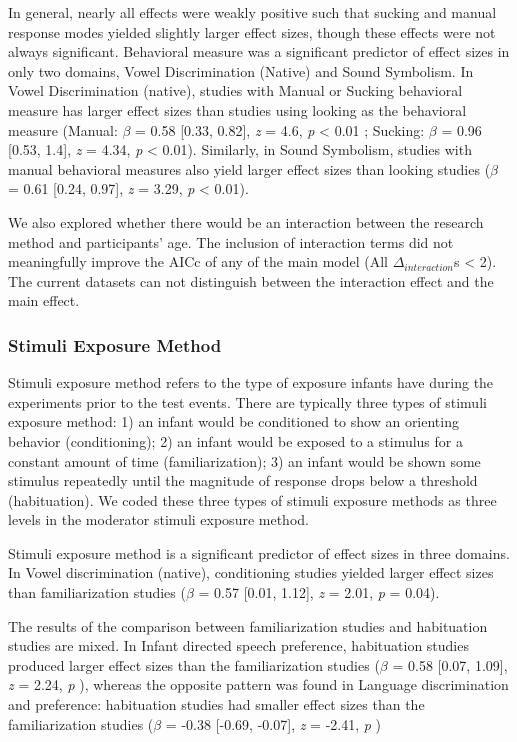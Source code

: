 \documentclass[10pt, letterpaper]{article}
\begin{document}
In general, nearly all effects were weakly positive such that sucking
and manual response modes yielded slightly larger effect sizes, though
these effects were not always significant. Behavioral measure was a
significant predictor of effect sizes in only two domains, Vowel
Discrimination (Native) and Sound Symbolism. In Vowel Discrimination
(native), studies with Manual or Sucking behavioral measure has larger
effect sizes than studies using looking as the behavioral measure
(Manual: \(\beta\) = 0.58 {[}0.33, 0.82{]}, \emph{z} = 4.6, \emph{p}
\textless{} 0.01 ; Sucking: \(\beta\) = 0.96 {[}0.53, 1.4{]}, \emph{z} =
4.34, \emph{p} \textless{} 0.01). Similarly, in Sound Symbolism, studies
with manual behavioral measures also yield larger effect sizes than
looking studies (\(\beta\) = 0.61 {[}0.24, 0.97{]}, \emph{z} = 3.29,
\emph{p} \textless{} 0.01).

We also explored whether there would be an interaction between the
research method and participants' age. The inclusion of interaction
terms did not meaningfully improve the AICc of any of the main model
(All \(\Delta_{interaction}\)s \textless{} 2). The current datasets can
not distinguish between the interaction effect and the main effect.

\hypertarget{stimuli-exposure-method}{%
\subsubsection{Stimuli Exposure Method}\label{stimuli-exposure-method}}

Stimuli exposure method refers to the type of exposure infants have
during the experiments prior to the test events. There are typically
three types of stimuli exposure method: 1) an infant would be
conditioned to show an orienting behavior (conditioning); 2) an infant
would be exposed to a stimulus for a constant amount of time
(familiarization); 3) an infant would be shown some stimulus repeatedly
until the magnitude of response drops below a threshold (habituation).
We coded these three types of stimuli exposure methods as three levels
in the moderator stimuli exposure method.

Stimuli exposure method is a significant predictor of effect sizes in
three domains. In Vowel discrimination (native), conditioning studies
yielded larger effect sizes than familiarization studies (\(\beta\) =
0.57 {[}0.01, 1.12{]}, \emph{z} = 2.01, \emph{p} = 0.04).

The results of the comparison between familiarization studies and
habituation studies are mixed. In Infant directed speech preference,
habituation studies produced larger effect sizes than the
familiarization studies (\(\beta\) = 0.58 {[}0.07, 1.09{]}, \emph{z} =
2.24, \emph{p} ), whereas the opposite pattern was found in Language
discrimination and preference: habituation studies had smaller effect
sizes than the familiarization studies (\(\beta\) = -0.38 {[}-0.69,
-0.07{]}, \emph{z} = -2.41, \emph{p} )
\end{document}
